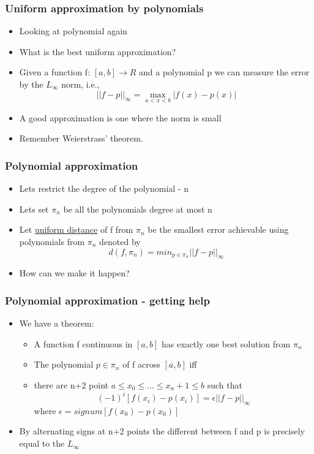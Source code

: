 \documentclass[10pt]{beamer}
\begin{document}
\begin{frame}
  \frametitle{Uniform approximation by polynomials}
  \begin{itemize}
  \item Looking at polynomial again
  \item What is the best uniform approximation?
  \item Given a function f: $[a,b] \rightarrow R$ and a polynomial p we can measure the error by the $L_{\infty}$ norm, i.e.,
    \[
      ||f-p||_{\infty} = \max_{a<x<b} | f(x) - p(x) |
    \]
  \item A good approximation is one where the norm is small
  \item Remember Weierstrass' theorem.
  \end{itemize}
\end{frame}

\begin{frame}
  \frametitle{Polynomial approximation}
  \begin{itemize}
  \item Lets restrict the degree of the polynomial - n
  \item Lets set $\pi_n$ be all the polynomials degree at most n
  \item Let {\underline{uniform distance}} of f from $\pi_n$ be the smallest
    error achievable using polynomials from $\pi_n$ denoted by
    \[
      d(f,\pi_n) = min_{p\in \pi_n} ||f - p ||_{\infty}
    \]

  \item How can we make it happen? 
  \end{itemize}
\end{frame}

\begin{frame}
  \frametitle{Polynomial approximation - getting help}
  \begin{itemize}
  \item We have a theorem:
    \begin{itemize}
    \item A function f continuous in $[a,b]$ has exactly one best
      solution from $\pi_n$
    \item The polynomial $p \in \pi_n$ of f across $[a,b]$ iff
    \item there are n+2 point $a \leq x_0 \leq \ldots \leq x_n+1 \leq b$ such that
      \[
        (-1)^i [ f(x_i) - p(x_i) ] = \epsilon ||f-p||_{\infty}
      \]
      where $\epsilon = signum[f(x_0)-p(x_0)]$
    \end{itemize}
  \item By alternating signs at n+2 points the different between f and p is precisely equal to the $L_{\infty}$
  \end{itemize}
\end{frame}
\end{document}
